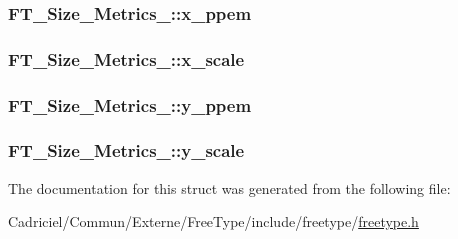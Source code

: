 \hypertarget{struct_f_t___size___metrics___abb42b175a3450e9d8b84483f166d6c8a}{
\subsubsection[{x\-\_\-ppem}]{ F\-T\-\_\-\-Size\-\_\-\-Metrics\-\_\-\-::x\-\_\-ppem}}\label{struct_f_t___size___metrics___abb42b175a3450e9d8b84483f166d6c8a}
\hypertarget{struct_f_t___size___metrics___a5e92028bb9881e107a6fb75d557eaff1}{
\subsubsection[{x\-\_\-scale}]{ F\-T\-\_\-\-Size\-\_\-\-Metrics\-\_\-\-::x\-\_\-scale}}\label{struct_f_t___size___metrics___a5e92028bb9881e107a6fb75d557eaff1}
\hypertarget{struct_f_t___size___metrics___abcdb70cb9e39a74679bc39c07f3275f7}{
\subsubsection[{y\-\_\-ppem}]{ F\-T\-\_\-\-Size\-\_\-\-Metrics\-\_\-\-::y\-\_\-ppem}}\label{struct_f_t___size___metrics___abcdb70cb9e39a74679bc39c07f3275f7}
\hypertarget{struct_f_t___size___metrics___a1f8b1cb3538b9920127f721dd061379d}{
\subsubsection[{y\-\_\-scale}]{ F\-T\-\_\-\-Size\-\_\-\-Metrics\-\_\-\-::y\-\_\-scale}}\label{struct_f_t___size___metrics___a1f8b1cb3538b9920127f721dd061379d}


The documentation for this struct was generated from the following file\-:\begin{DoxyCompactItemize}
\item 
Cadriciel/\-Commun/\-Externe/\-Free\-Type/include/freetype/\hyperlink{freetype_8h}{freetype.\-h}\end{DoxyCompactItemize}
